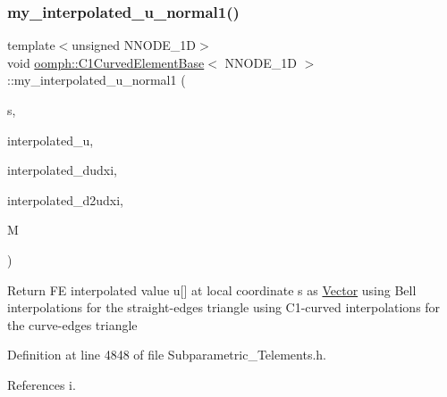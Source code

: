 \subsubsection{\texorpdfstring{my\+\_\+interpolated\+\_\+u\+\_\+normal1()}{my\_interpolated\_u\_normal1()}}
{\footnotesize\ttfamily template$<$unsigned N\+N\+O\+D\+E\+\_\+1D$>$ \\
void \hyperlink{classoomph_1_1C1CurvedElementBase}{oomph\+::\+C1\+Curved\+Element\+Base}$<$ N\+N\+O\+D\+E\+\_\+1D $>$\+::my\+\_\+interpolated\+\_\+u\+\_\+normal1 (\begin{DoxyParamCaption}\item[{const \hyperlink{classoomph_1_1Vector}{Vector}$<$ double $>$}]{s,  }\item[{\hyperlink{classoomph_1_1Vector}{Vector}$<$ double $>$ \&}]{interpolated\+\_\+u,  }\item[{\hyperlink{classoomph_1_1DenseMatrix}{Dense\+Matrix}$<$ double $>$ \&}]{interpolated\+\_\+dudxi,  }\item[{\hyperlink{classoomph_1_1DenseMatrix}{Dense\+Matrix}$<$ double $>$ \&}]{interpolated\+\_\+d2udxi,  }\item[{\hyperlink{classoomph_1_1DenseMatrix}{Dense\+Matrix}$<$ double $>$ \&}]{M }\end{DoxyParamCaption})\hspace{0.3cm}{\ttfamily [inline]}}

Return FE interpolated value u\mbox{[}\mbox{]} at local coordinate s as \hyperlink{classoomph_1_1Vector}{Vector} using Bell interpolations for the straight-\/edges triangle using C1-\/curved interpolations for the curve-\/edges triangle 

Definition at line 4848 of file Subparametric\+\_\+\+Telements.\+h.



References i.

\mbox{\label{classoomph_1_1C1CurvedElementBase_ac6b4ddc3a10424d88e278c1e260b5a10}} 
